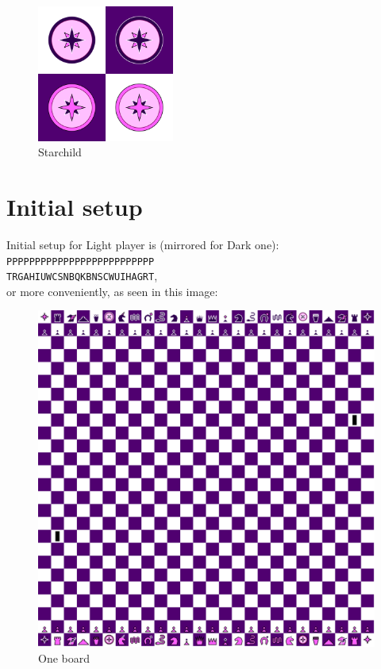 \documentclass[a5paper,12pt,draft]{book} %
\begin{document}
\noindent
\begin{figure}
\includegraphics[width=0.4\textwidth, keepaspectratio=true]{../gfx/pieces/16_starchild.png}
\caption{Starchild}
\label{fig:starchild}
\end{figure}

\clearpage

\section*{Initial setup}

Initial setup for Light player is (mirrored for Dark one):
\texttt{PPPPPPPPPPPPPPPPPPPPPPPPPP \\
        TRGAHIUWCSNBQKBNSCWUIHAGRT}, \\
or more conveniently, as seen in this image:

\noindent
\begin{figure}[h]
\includegraphics[width=1.0\textwidth, keepaspectratio=true]{../gfx/boards/22_one.png}
\caption{One board}
\label{fig:one}
\end{figure}
\end{document}
